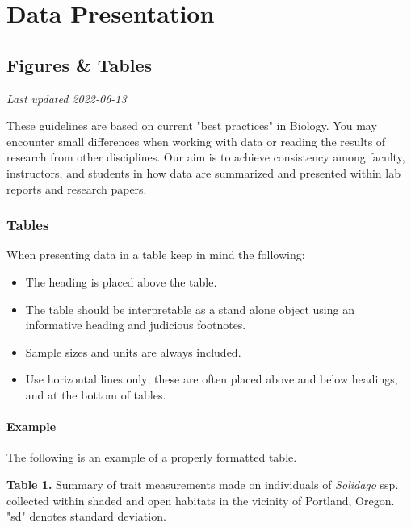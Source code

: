 \documentclass[
]{book}
\providecommand{\tightlist}{%
  \setlength{\itemsep}{0pt}\setlength{\parskip}{0pt}}
\begin{document}
\hypertarget{part-data-presentation}{%
\part*{Data Presentation}\label{part-data-presentation}}

\hypertarget{figures-tables}{%
\chapter{Figures \& Tables}\label{figures-tables}}

\emph{Last updated 2022-06-13}

These guidelines are based on current "best practices" in Biology. You may encounter small differences when working with data or reading the results of research from other disciplines. Our aim is to achieve consistency among faculty, instructors, and students in how data are summarized and presented within lab reports and research papers.

\hypertarget{tables}{%
\section{Tables}\label{tables}}

When presenting data in a table keep in mind the following:

\begin{itemize}
\tightlist
\item
  The heading is placed above the table.
\item
  The table should be interpretable as a stand alone object using an informative heading and judicious footnotes.
\item
  Sample sizes and units are always included.
\item
  Use horizontal lines only; these are often placed above and below headings, and at the bottom of tables.
\end{itemize}

\hypertarget{example}{%
\subsection*{Example}\label{example}}

The following is an example of a properly formatted table.

\textbf{Table 1.} Summary of trait measurements made on individuals of \emph{Solidago} ssp. collected within shaded and open habitats in the vicinity of Portland, Oregon. "sd" denotes standard deviation.
\end{document}
